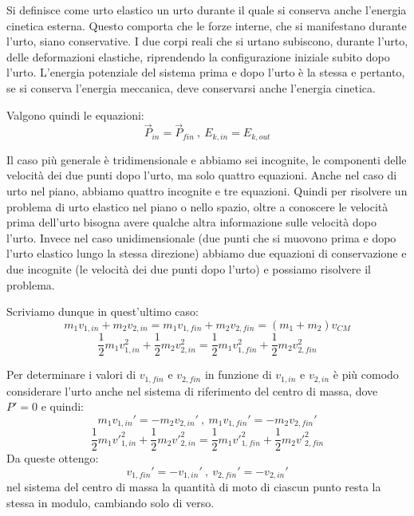 \documentclass[class=book, crop=false, oneside, 12pt]{standalone}
\begin{document}
Si definisce come urto elastico un urto durante il quale si conserva anche l'energia cinetica esterna.
Questo comporta che le forze interne, che si manifestano durante l'urto, siano conservative. 
I due corpi reali che si urtano subiscono, durante l'urto, delle deformazioni elastiche, riprendendo la configurazione iniziale subito dopo l'urto.
L'energia potenziale del sistema prima e dopo l'urto è la stessa e pertanto, se si conserva l'energia meccanica, deve conservarsi anche l'energia cinetica.

Valgono quindi le equazioni:
\begin{equation*}
    \overrightarrow{P}_{in} = \overrightarrow{P}_{fin} \ , \ E_{k,in} = E_{k,out}
\end{equation*}

Il caso più generale è tridimensionale e abbiamo sei incognite, le componenti delle velocità dei due punti dopo l'urto, ma solo quattro equazioni.
Anche nel caso di urto nel piano, abbiamo quattro incognite e tre equazioni. 
Quindi per risolvere un problema di urto elastico nel piano o nello spazio, oltre a conoscere le velocità prima dell'urto bisogna avere qualche altra informazione sulle velocità dopo l'urto.
Invece nel caso unidimensionale (due punti che si muovono prima e dopo l'urto elastico lungo la stessa direzione) abbiamo due equazioni di conservazione e due incognite (le velocità dei due punti dopo l'urto) e possiamo risolvere il problema.

Scriviamo dunque in quest'ultimo caso:
\begin{equation*}
    m_1 v_{1,in} + m_2 v_{2,in} = m_1 v_{1,fin} + m_2 v_{2,fin} = \left( m_1 + m_2 \right) v_{CM}
\end{equation*}
\begin{equation*}
    \frac{1}{2} m_1 v_{1,in}^2 + \frac{1}{2} m_2 v_{2,in}^2 = \frac{1}{2} m_1 v_{1,fin}^2 + \frac{1}{2} m_2 v_{2,fin}^2
\end{equation*}

Per determinare i valori di \(v_{1,fin}\) e \(v_{2,fin}\) in funzione di \(v_{1,in}\) e \(v_{2,in}\) è più comodo considerare l'urto anche nel sistema di riferimento del centro di massa, dove \(P' =0\) e quindi: 
\begin{equation*}
    m_1 v_{1,in}' = -m_2 v_{2,in}' \ , \  m_1 v_{1,fin}' = -m_2 v_{2,fin}'
\end{equation*}
\begin{equation*}
    \frac{1}{2} m_1 {v'}_{1,in}^2 + \frac{1}{2} m_2 {v'}_{2,in}^2 = \frac{1}{2} m_1 {v'}_{1,fin}^2 + \frac{1}{2} m_2 {v'}_{2,fin}^2
\end{equation*}
Da queste ottengo:
\begin{equation*}
    v_{1,fin}' = - v_{1,in}' \ , \ v_{2,fin}' = - v_{2,in}'
\end{equation*}
nel sistema del centro di massa la quantità di moto di ciascun punto resta la stessa in modulo, cambiando solo di verso. 
\end{document}
